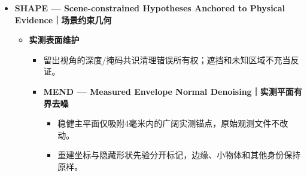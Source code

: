\documentclass[UTF8,fontset=fandol]{ctexart}
\begin{document}
\begin{itemize}
\begin{itemize}
\begin{itemize}
\begin{itemize}
\item 已确认表面取回重复点，未知余量保留；不设定固定两排或物体数量。


\item FAST-MCD、主平面及实测连通分量审核稀疏污染，证据不足撤销修正。

\end{itemize}

\item \textbf{HMG — Hierarchical Mask Guard｜整体掩码保护}


\begin{itemize}
\item 候选拒绝前核验原生重叠掩码、深度可见性和相机基线；整体不因部件占据互斥像素而消失。


\item 图像身份仍须胜过背景/结构反证；未知点保留，重复反证点才移除。

\end{itemize}

\item 保留可靠分离证据；候选验收、冲突身份及背景/台面反证决定最终独立物体。


\item GPT比较流程新增可见归属竞争、局部地板反证与唯一完整物体锚定；同一实测面不重复计数，精细实例受保护。

\end{itemize}
\end{itemize}

\item \textbf{SHAPE — Scene-constrained Hypotheses Anchored to Physical Evidence｜场景约束几何}


\begin{itemize}
\item \textbf{实测表面维护}


\begin{itemize}
\item 留出视角的深度/掩码共识清理错误所有权；遮挡和未知区域不充当反证。


\item \textbf{MEND — Measured Envelope Normal Denoising｜实测平面有界去噪}


\begin{itemize}
\item 稳健主平面仅吸附4毫米内的广阔实测锚点，原始观测文件不改动。


\item 重建坐标与隐藏形状先验分开标记，边缘、小物体和其他身份保持原样。


\end{itemize}
\end{itemize}
\end{itemize}
\end{itemize}
\end{document}
